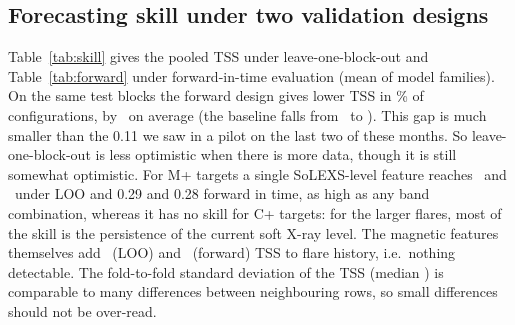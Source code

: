 \documentclass[conference]{IEEEtran}
\begin{document}
\subsection{Forecasting skill under two validation designs}
Table~\ref{tab:skill} gives the pooled TSS under leave-one-block-out and Table~\ref{tab:forward} under forward-in-time evaluation (mean of model families). On the same test blocks the forward design gives lower TSS in \FwdShareLower\% of configurations, by \FwdDiffMean\ on average (the baseline falls from \HistLooBlocks\ to \HistFwd). This gap is much smaller than the 0.11 we saw in a pilot on the last two of these months. So leave-one-block-out is less optimistic when there is more data, though it is still somewhat optimistic. For M+ targets a single SoLEXS-level feature reaches \LevelMThirty\ and \LevelMSixty\ under LOO and 0.29 and 0.28 forward in time, as high as any band combination, whereas it has no skill for C+ targets: for the larger flares, most of the skill is the persistence of the current soft X-ray level. The magnetic features themselves add \MagGainLoo\ (LOO) and \MagGainFwd\ (forward) TSS to flare history, i.e.\ nothing detectable. The fold-to-fold standard deviation of the TSS (median \MedFoldSD) is comparable to many differences between neighbouring rows, so small differences should not be over-read.

\begin{table}[t]
\caption{Pooled TSS, leave-one-block-out (mean of three model families). All rows except the last include flare history; ``History + magnetic'' is the baseline.}
\label{tab:skill}
\centering\footnotesize

\end{table}

\begin{table}[t]
\caption{Pooled TSS, forward-in-time (blocks 3--8; mean of logistic and boosted-tree families).}
\label{tab:forward}
\centering\footnotesize

\end{table}
\end{document}
